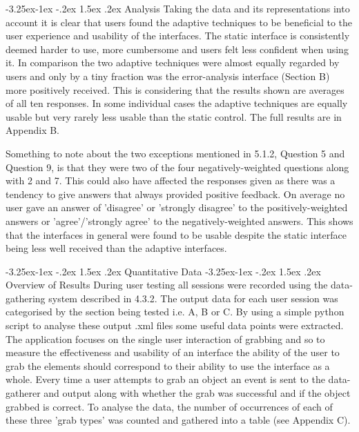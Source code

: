 \documentclass[12pt]{article}
\makeatletter
\renewcommand{\subsection}{\@startsection{subsection}{2}{\z@}%
             {-3.25ex\@plus -1ex \@minus -.2ex}%
             {1.5ex \@plus .2ex}%
             {\normalfont\large\scshape\bfseries}}
\renewcommand{\subsubsection}{\@startsection{subsubsection}{2}{\z@}%
             {-3.25ex\@plus -1ex \@minus -.2ex}%
             {1.5ex \@plus .2ex}%
             {\normalfont\normalsize\scshape\bfseries}}
\makeatother
\begin{document}
\subsubsection{Analysis}
Taking the data and its representations into account it is clear that users found the adaptive techniques to be beneficial to the user experience and usability of the interfaces. The static interface is consistently deemed harder to use, more cumbersome and users felt less confident when using it. In comparison the two adaptive techniques were almost equally regarded by users and only by a tiny fraction was the error-analysis interface (Section B) more positively received. This is considering that the results shown are averages of all ten responses. In some individual cases the adaptive techniques are equally usable but very rarely less usable than the static control. The full results are in Appendix B.

Something to note about the two exceptions mentioned in 5.1.2, Question 5 and Question 9, is that they were two of the four negatively-weighted questions along with 2 and 7. This could also have affected the responses given as there was a tendency to give answers that always provided positive feedback. On average no user gave an answer of 'disagree' or 'strongly disagree' to the positively-weighted answers or 'agree'/'strongly agree' to the negatively-weighted answers. This shows that the interfaces in general were found to be usable despite the static interface being less well received than the adaptive interfaces.

\subsection{Quantitative Data}
\subsubsection{Overview of Results}
During user testing all sessions were recorded using the data-gathering system described in 4.3.2. The output data for each user session was categorised by the section being tested i.e. A, B or C. By using a simple python script to analyse these output .xml files some useful data points were extracted. The application focuses on the single user interaction of grabbing and so to measure the effectiveness and usability of an interface the ability of the user to grab the elements should correspond to their ability to use the interface as a whole. Every time a user attempts to grab an object an event is sent to the data-gatherer and output along with whether the grab was successful and if the object grabbed is correct. To analyse the data, the number of occurrences of each of these three 'grab types' was counted and gathered into a table (see Appendix C). 
\end{document}
